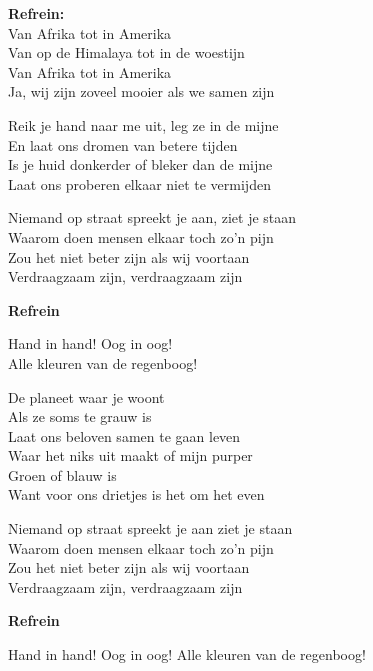 \textbf{Refrein:}\\
Van Afrika tot in Amerika\\
Van op de Himalaya tot in de woestijn\\
Van Afrika tot in Amerika\\
Ja, wij zijn zoveel mooier als we samen zijn

Reik je hand naar me uit, leg ze in de mijne\\
En laat ons dromen van betere tijden\\
Is je huid donkerder of bleker dan de mijne\\
Laat ons proberen elkaar niet te vermijden

Niemand op straat spreekt je aan, ziet je staan\\
Waarom doen mensen elkaar toch zo'n pijn\\
Zou het niet beter zijn als wij voortaan\\
Verdraagzaam zijn, verdraagzaam zijn

\textbf{Refrein}

Hand in hand! Oog in oog!\\
Alle kleuren van de regenboog!

De planeet waar je woont\\
Als ze soms te grauw is\\
Laat ons beloven samen te gaan leven\\
Waar het niks uit maakt of mijn purper\\
Groen of blauw is\\
Want voor ons drietjes is het om het even

Niemand op straat spreekt je aan ziet je staan\\
Waarom doen mensen elkaar toch zo'n pijn\\
Zou het niet beter zijn als wij voortaan\\
Verdraagzaam zijn, verdraagzaam zijn

\textbf{Refrein}

Hand in hand! Oog in oog!
Alle kleuren van de regenboog!
